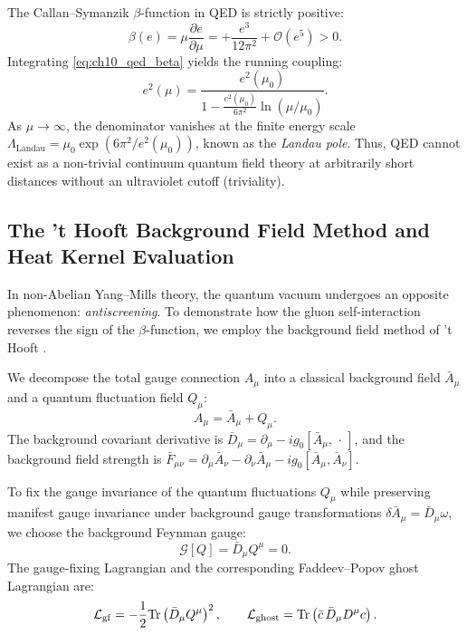 The Callan--Symanzik $\beta$-function in QED is strictly positive:
\begin{equation}
\label{eq:ch10_qed_beta}
\beta(e) = \mu \frac{\partial e}{\partial \mu} = +\frac{e^3}{12\pi^2} + \mathcal{O}(e^5) > 0.
\end{equation}
Integrating \eqref{eq:ch10_qed_beta} yields the running coupling:
\begin{equation}
\label{eq:ch10_qed_running}
e^2(\mu) = \frac{e^2(\mu_0)}{1 - \frac{e^2(\mu_0)}{6\pi^2} \ln(\mu/\mu_0)}.
\end{equation}
As $\mu \to \infty$, the denominator vanishes at the finite energy scale $\Lambda_{\mathrm{Landau}} = \mu_0 \exp(6\pi^2 / e^2(\mu_0))$, known as the \emph{Landau pole}. Thus, QED cannot exist as a non-trivial continuum quantum field theory at arbitrarily short distances without an ultraviolet cutoff (triviality).

\subsection{The 't Hooft Background Field Method and Heat Kernel Evaluation}
\label{subsec:background_field_method}

In non-Abelian Yang--Mills theory, the quantum vacuum undergoes an opposite phenomenon: \emph{antiscreening}. To demonstrate how the gluon self-interaction reverses the sign of the $\beta$-function, we employ the background field method of 't Hooft \cite{tHooft1971}.

We decompose the total gauge connection $A_\mu$ into a classical background field $\bar{A}_\mu$ and a quantum fluctuation field $Q_\mu$:
\begin{equation}
A_\mu = \bar{A}_\mu + Q_\mu.
\end{equation}
The background covariant derivative is $\bar{D}_\mu = \partial_\mu - i g_0 [\bar{A}_\mu, \,\cdot\,]$, and the background field strength is $\bar{F}_{\mu\nu} = \partial_\mu \bar{A}_\nu - \partial_\nu \bar{A}_\mu - i g_0 [\bar{A}_\mu, \bar{A}_\nu]$.

To fix the gauge invariance of the quantum fluctuations $Q_\mu$ while preserving manifest gauge invariance under background gauge transformations $\delta \bar{A}_\mu = \bar{D}_\mu \omega$, we choose the background Feynman gauge:
\begin{equation}
\label{eq:ch10_background_gauge_fixing}
\mathcal{G}[Q] = \bar{D}_\mu Q^\mu = 0.
\end{equation}
The gauge-fixing Lagrangian and the corresponding Faddeev--Popov ghost Lagrangian are:
\begin{equation}
\mathcal{L}_{\mathrm{gf}} = -\frac{1}{2} \mathrm{Tr}\left( \bar{D}_\mu Q^\mu \right)^2, \qquad \mathcal{L}_{\mathrm{ghost}} = \mathrm{Tr}\left( \bar{c} \, \bar{D}_\mu D^\mu c \right).
\end{equation}

